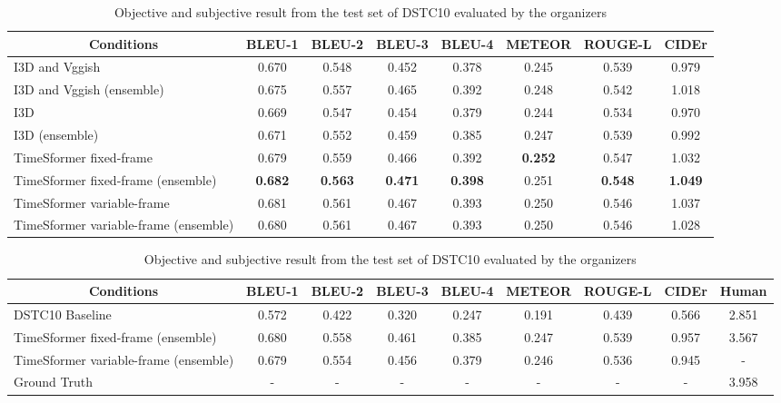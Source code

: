 \documentclass[letterpaper]{article}
\begin{document}
\begin{table}[t]
  \centering
  \small
  \caption{Objective result from the test set of DSTC8}
  \label{tab:dstc8_result}
  \begin{adjustbox}{width=0.58\columnwidth}
\begin{tabular}{l|ccccccc}\hline
    \multicolumn{1}{c|}{Conditions} & BLEU-1 & BLEU-2 & BLEU-3 & BLEU-4 & METEOR & ROUGE-L & CIDEr \\ \hline
    I3D and Vggish \cite{Li2021bridging} & 0.670 & 0.548 & 0.452 & 0.378 & 0.245 & 0.539 & 0.979 \\
    I3D and Vggish (ensemble) & 0.675 & 0.557 & 0.465 & 0.392 & 0.248 & 0.542 & 1.018 \\
    I3D & 0.669 & 0.547 & 0.454 & 0.379 & 0.244 & 0.534 & 0.970 \\
    I3D (ensemble) & 0.671 & 0.552 & 0.459 & 0.385 & 0.247 & 0.539 & 0.992 \\
    TimeSformer fixed-frame & 0.679 & 0.559 & 0.466 & 0.392 & \textbf{0.252} & 0.547 & 1.032 \\
    TimeSformer fixed-frame (ensemble) & \textbf{0.682} & \textbf{0.563} & \textbf{0.471} & \textbf{0.398} & 0.251 & \textbf{0.548} & \textbf{1.049} \\
    TimeSformer variable-frame & 0.681 & 0.561 & 0.467 & 0.393 & 0.250 & 0.546 & 1.037 \\
    TimeSformer variable-frame (ensemble) & 0.680 & 0.561 & 0.467 & 0.393 & 0.250 & 0.546 & 1.028 \\ \hline
  \end{tabular}
\end{adjustbox}

  \centering
  \small
  \caption{Objective and subjective result from the test set of DSTC10 evaluated by the organizers}
  \label{tab:dstc10_result}
  \begin{adjustbox}{width=0.58\columnwidth}
\begin{tabular}{l|cccccccc}\hline
    \multicolumn{1}{c|}{Conditions} & BLEU-1 & BLEU-2 & BLEU-3 & BLEU-4 & METEOR & ROUGE-L & CIDEr & Human \\ \hline
    DSTC10 Baseline~\cite{Shah2021audio} & 0.572 & 0.422 & 0.320 & 0.247 & 0.191 & 0.439 & 0.566 & 2.851 \\
    TimeSformer fixed-frame (ensemble) & 0.680 & 0.558 & 0.461 & 0.385 & 0.247 & 0.539 & 0.957 & 3.567 \\
    TimeSformer variable-frame (ensemble) & 0.679 & 0.554 & 0.456 & 0.379 & 0.246 & 0.536 & 0.945 & - \\
    Ground Truth & - & - & - & - & - & - & - & 3.958 \\ \hline
  \end{tabular}
\end{adjustbox}
\end{table}
\end{document}
